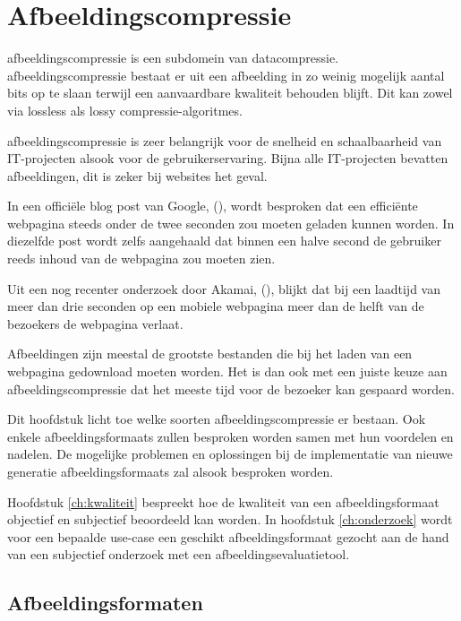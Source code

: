\chapter{Afbeeldingscompressie}
\label{ch:afbeeldingscompressie}

\Gls{afbeeldingscompressie} is een subdomein van \gls{datacompressie}. \Gls{afbeeldingscompressie} bestaat er uit een afbeelding in zo weinig mogelijk aantal \glspl{bit} op te slaan terwijl een aanvaardbare kwaliteit behouden blijft. Dit kan zowel via \gls{lossless} als \gls{lossy} \glspl{compressie-algoritme}.

\Gls{afbeeldingscompressie} is zeer belangrijk voor de snelheid en schaalbaarheid van IT-projecten alsook voor de gebruikerservaring. Bijna alle IT-projecten bevatten afbeeldingen, dit is zeker bij websites het geval.

In een officiële blog post van Google,  (\cite{googleinternetspeed}), wordt besproken dat een efficiënte webpagina steeds onder de twee seconden zou moeten geladen kunnen worden. In diezelfde post wordt zelfs aangehaald dat binnen een halve second de gebruiker reeds inhoud van de webpagina zou moeten zien.

Uit een nog recenter onderzoek door Akamai,  (\cite{akamaiinternetspeed}), blijkt dat bij een laadtijd van meer dan drie seconden op een mobiele webpagina meer dan de helft van de bezoekers de webpagina verlaat.

Afbeeldingen zijn meestal de grootste bestanden die bij het laden van een webpagina gedownload moeten worden. Het is dan ook met een juiste keuze aan \gls{afbeeldingscompressie} dat het meeste tijd voor de bezoeker kan gespaard worden. 

Dit hoofdstuk licht toe welke soorten \gls{afbeeldingscompressie} er bestaan. Ook enkele \glspl{afbeeldingsformaat} zullen besproken worden samen met hun voordelen en nadelen. De mogelijke problemen en oplossingen bij de implementatie van nieuwe generatie \glspl{afbeeldingsformaat} zal alsook besproken worden.

Hoofdstuk \ref{ch:kwaliteit} bespreekt hoe de kwaliteit van een \gls{afbeeldingsformaat} objectief en subjectief beoordeeld kan worden. In hoofdstuk \ref{ch:onderzoek} wordt voor een bepaalde \gls{use-case} een geschikt \gls{afbeeldingsformaat} gezocht aan de hand van een subjectief onderzoek met een \gls{afbeeldingsevaluatietool}.

\section{Afbeeldingsformaten}
\label{sec:afbeeldingscompressie-afbeeldingsformaten}


